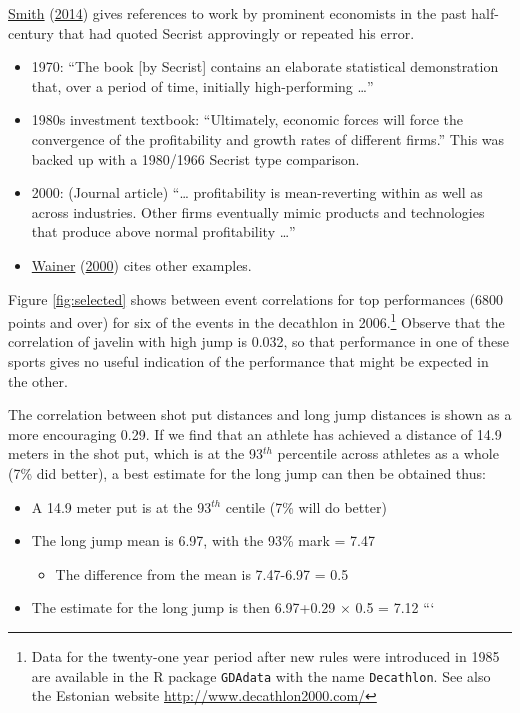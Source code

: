 \documentclass[
  10pt,
  b5paper]{book}
\providecommand{\tightlist}{%
  \setlength{\itemsep}{0pt}\setlength{\parskip}{0pt}}
\begin{document}
\protect\hyperlink{ref-smith-sd}{Smith} (\protect\hyperlink{ref-smith-sd}{2014}) gives references to work by prominent economists in the past
half-century that had quoted Secrist approvingly or repeated his error.

\begin{itemize}
\tightlist
\item
  1970: ``The book {[}by Secrist{]} contains an elaborate statistical
  demonstration that, over a period of time, initially high-performing \ldots{}''
\item
  1980s investment textbook: ``Ultimately, economic forces will force
  the convergence of the profitability and growth rates of different firms.''
  This was backed up with a 1980/1966 Secrist type comparison.
\item
  2000: (Journal article) ``\ldots{} profitability is mean-reverting within
  as well as across industries. Other firms eventually mimic products
  and technologies that produce above normal profitability \ldots{}''
\item
  \protect\hyperlink{ref-wainerRegress}{Wainer} (\protect\hyperlink{ref-wainerRegress}{2000}) cites other examples.
\end{itemize}

Figure \ref{fig:selected} shows between event correlations for
top performances (6800 points and over) for six of the events
in the decathlon in
2006.\footnote{Data for the twenty-one year period after new rules were
  introduced in 1985 are available in the R package \texttt{GDAdata} with
  the name \texttt{Decathlon}. See also the Estonian website
  \url{http://www.decathlon2000.com/}} Observe that the correlation
of javelin with high jump is 0.032, so that performance in one
of these sports gives no useful indication of the performance
that might be expected in the other.

The correlation between shot put distances and long jump distances
is shown as a more encouraging 0.29. If we find that an athlete has
achieved a distance of 14.9 meters in the shot put, which is at
the 93\(^{th}\) percentile across athletes as a whole (7\% did better),
a best estimate for the long jump can then be obtained thus:

\begin{itemize}
\tightlist
\item
  A 14.9 meter put is at the 93\(^{th}\) centile (7\% will do better)
\item
  The long jump mean is 6.97, with the 93\% mark = 7.47

  \begin{itemize}
  \tightlist
  \item
    The difference from the mean is 7.47-6.97 = 0.5
  \end{itemize}
\item
  The estimate for the long jump is then 6.97+0.29 \(\times\) 0.5 = 7.12
  ```
\end{itemize}
\end{document}
